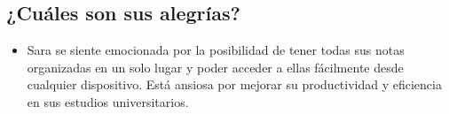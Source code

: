 \subsection*{¿Cuáles son sus alegrías?}
\begin{itemize}
    \item Sara se siente emocionada por la posibilidad de tener todas sus notas organizadas en un solo lugar y poder acceder a ellas fácilmente desde cualquier dispositivo. Está ansiosa por mejorar su productividad y eficiencia en sus estudios universitarios.
\end{itemize}